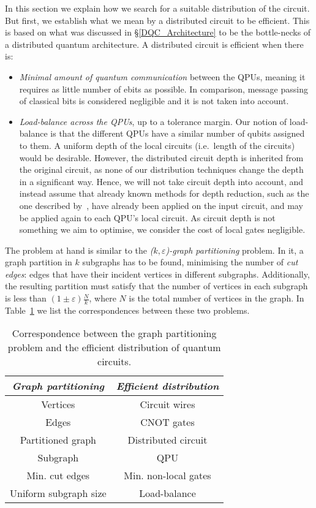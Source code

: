 In this section we explain how we search for a suitable distribution of the circuit. But first, we establish what we mean by a distributed circuit to be efficient. This is based on what was discussed in \S\ref{DQC_Architecture} to be the bottle-necks of a distributed quantum architecture. A distributed circuit is efficient when there is:

\begin{itemize}
  \item \textit{Minimal amount of quantum communication} between the QPUs, meaning it requires as little number of ebits as possible. In comparison, message passing of classical bits is considered negligible and it is not taken into account.
  \item \textit{Load-balance across the QPUs}, up to a tolerance margin. Our notion of load-balance is that the different QPUs have a similar number of qubits assigned to them. A uniform depth of the local circuits (i.e.\ length of the circuits) would be desirable. However, the distributed circuit depth is inherited from the original circuit, as none of our distribution techniques change the depth in a significant way. Hence, we will not take circuit depth into account, and instead assume that already known methods for depth reduction, such as the one described by~\citet{DepthReduction}, have already been applied on the input circuit, and may be applied again to each QPU's local circuit. As circuit depth is not something we aim to optimise, we consider the cost of local gates negligible.
\end{itemize}

The problem at hand is similar to the  \textit{(\(k,\varepsilon\))-graph partitioning} problem. In it, a graph partition in \(k\) subgraphs has to be found, minimising the number of \textit{cut edges}: edges that have their incident vertices in different subgraphs. Additionally, the resulting partition must satisfy that the number of vertices in each subgraph is less than \((1 \pm \varepsilon)\frac{N}{k}\), where \(N\) is the total number of vertices in the graph. In Table~\ref{tab:matching} we list the correspondences between these two problems.

\begin{table}
\caption{Correspondence between the graph partitioning problem and the efficient distribution of quantum circuits.}
\label{tab:matching}
\centering
\begin{tabular}{|c|c|}
\hline
\textit{Graph partitioning} & \textit{Efficient distribution} \\
\hline
Vertices & Circuit wires \\
Edges & CNOT gates \\
Partitioned graph & Distributed circuit \\
Subgraph & QPU \\
Min. cut edges & Min. non-local gates \\
Uniform subgraph size & Load-balance \\
\hline
\end{tabular}
\end{table}

